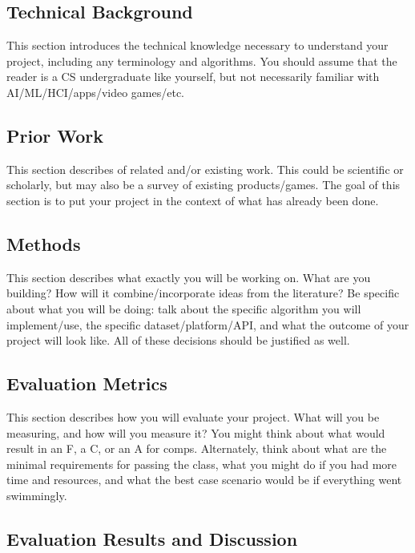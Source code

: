 \documentclass[10pt,twocolumn]{article}
\begin{document}
\subsection{Technical Background}

This section introduces the technical knowledge necessary to understand your project, including any terminology and algorithms.
You should assume that the reader is a CS undergraduate like yourself, but not necessarily familiar with AI/ML/HCI/apps/video games/etc.

\subsection{Prior Work}

This section describes of related and/or existing work.
This could be scientific or scholarly, but may also be a survey of existing products/games.
The goal of this section is to put your project in the context of what has already been done.

\subsection{Methods}

This section describes what exactly you will be working on.
What are you building? How will it combine/incorporate ideas from the literature? Be specific about what you will be doing: talk about the specific algorithm you will implement/use, the specific dataset/platform/API, and what the outcome of your project will look like.
All of these decisions should be justified as well.



\subsection{Evaluation Metrics}

This section describes how you will evaluate your project.
What will you be measuring, and how will you measure it?
You might think about what would result in an F, a C, or an A for comps.
Alternately, think about what are the minimal requirements for passing the class, what you might do if you had more time and resources, and what the best case scenario would be if everything went swimmingly.

\subsection{Evaluation Results and Discussion}
\end{document}

